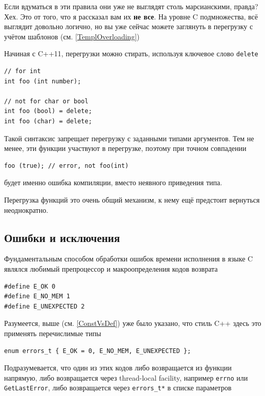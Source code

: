 \documentclass[a4paper,12pt,oneside]{article}
\begin{document}
Если вдуматься в эти правила они уже не выглядят столь марсианскими, правда? Хех. Это от того, что я рассказал вам их \textbf{не все}. На уровне C подмножества, всё выглядит довольно логично, но вы уже сейчас можете заглянуть в перегрузку с учётом шаблонов (см. \ref{TemplOverloading})

Начиная с C++11, перегрузки можно стирать, используя ключевое слово \lstinline!delete!

\begin{lstlisting}
// for int
int foo (int number);

// not for char or bool
int foo (bool) = delete;
int foo (char) = delete;
\end{lstlisting}

Такой синтаксис запрещает перегрузку с заданными типами аргументов. Тем не менее, эти функции участвуют в перегрузке, поэтому при точном совпадении

\begin{lstlisting}
foo (true); // error, not foo(int)
\end{lstlisting}

будет именно ошибка компиляции, вместо неявного приведения типа.

Перегрузка функций это очень общий механизм, к нему ещё предстоит вернуться неоднократно.

\pagebreak
\subsection{Ошибки и исключения}\label{subsec:basicexceptions}

Фундаментальным способом обработки ошибок времени исполнения в языке C являлся любимый препроцессор и макроопределения кодов возврата

\begin{lstlisting}
#define E_OK 0
#define E_NO_MEM 1
#define E_UNEXPECTED 2
\end{lstlisting}

Разумеется, выше (см. \ref{ConstVsDef}) уже было указано, что стиль C++ здесь это применять перечислимые типы

\begin{lstlisting}
enum errors_t { E_OK = 0, E_NO_MEM, E_UNEXPECTED };
\end{lstlisting}

Подразумевается, что один из этих кодов либо возвращается из функции напрямую, либо возвращается через thread-local facility, например \lstinline!errno! или \lstinline!GetLastError!, либо возвращается через \lstinline!errors_t*! в списке параметров
\end{document}
